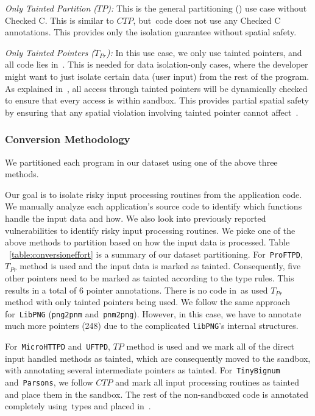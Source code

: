 \noindent\emph{Only Tainted Partition ($TP$):}
This is the general partitioning () use case without Checked C.
This is similar to $CTP$, but~\cregion code does not use any Checked C annotations.
This provides only the isolation guarantee without spatial safety.


\noindent\emph{Only Tainted Pointers ($T_{Pr}$):}
In this use case, we only use tainted pointers, and all code lies in~\cregion.
This is needed for data isolation-only cases, where the developer might want to just isolate certain data (\eg user input) from the rest of the program.
As explained in~, all access through tainted pointers will be dynamically checked to ensure that every access is within sandbox.
This provides partial spatial safety by ensuring that any spatial violation involving tainted pointer cannot affect~\cregion.

 
\subsubsection{Conversion Methodology}
We partitioned each program in our dataset using one of the above three methods.

Our goal is to isolate risky input processing routines from the application code.
We manually analyze each application's source code to identify which functions handle the input data and how.
We also look into previously reported vulnerabilities to identify risky input processing routines.
We picke one of the above methods to partition based on how the input data is processed.
Table ~\ref{table:conversioneffort} is a summary of our dataset partitioning.
For~\texttt{ProFTPD}, $T_{Pr}$ method is used and the input data is marked as tainted.
Consequently, five other pointers need to be marked as tainted according to the type rules. This results in a total of 6 pointer annotations. There is no code in~\ucregion as used $T_{Pr}$ method with only tainted pointers being used.
We follow the same approach for~\texttt{LibPNG} (\texttt{png2pnm} and~\texttt{pnm2png}). However, in this case, we have to annotate much more pointers (248) due to the complicated \texttt{libPNG}'s internal structures.

For~\texttt{MicroHTTPD} and~\texttt{UFTPD}, $TP$ method is used and we mark all of the direct input handled methods as tainted, which are consequently moved to the sandbox, with annotating several intermediate pointers as tainted.
For~\texttt{TinyBignum} and~\texttt{Parsons},
we follow $CTP$ and mark all input processing routines as tainted and place them in the sandbox.
The rest of the non-sandboxed code is annotated completely using~\checkedc types and placed in~\cregion.

